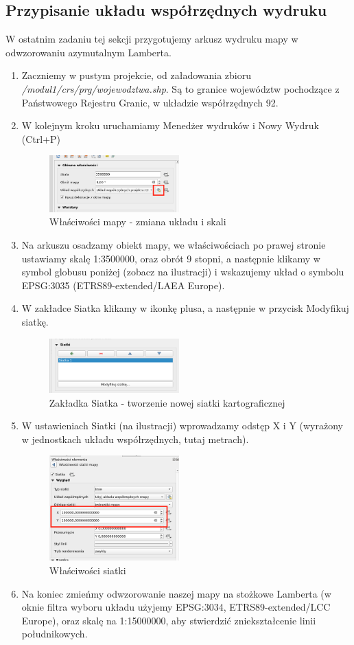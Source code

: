 \documentclass[a4paper,11pt, onecolumn, openany]{memoir}
\begin{document}
	\subsection{Przypisanie układu współrzędnych wydruku}
	W ostatnim zadaniu tej sekcji przygotujemy arkusz wydruku mapy w odwzorowaniu azymutalnym Lamberta.
	\begin{enumerate}
		\item Zaczniemy w pustym projekcie, od załadowania zbioru \emph{/modul1/crs/prg/wojewodztwa.shp}. Są to granice województw pochodzące z Państwowego Rejestru Granic, w układzie współrzędnych 92.
		\item W kolejnym kroku uruchamiamy Menedżer wydruków i Nowy Wydruk (Ctrl+P)
		\begin{figure}[!ht]
			\centering
			\includegraphics[width=5cm]{crs-wydruk-laea}
			\caption{Właściwości mapy - zmiana układu i skali}
		\end{figure}
		\item Na arkuszu osadzamy obiekt mapy, we właściwościach po prawej stronie ustawiamy skalę 1:3500000, oraz obrót 9 stopni, a następnie klikamy w symbol globusu poniżej (zobacz na ilustracji) i wskazujemy układ o symbolu EPSG:3035 (ETRS89-extended/LAEA Europe).
		\item W zakładce Siatka klikamy w ikonkę plusa, a następnie w przycisk Modyfikuj siatkę.
		\begin{figure}[!ht]
			\centering
			\includegraphics[width=5cm]{crs-laea-siatka}
			\caption{Zakładka Siatka - tworzenie nowej siatki kartograficznej}
		\end{figure}
		\item W ustawieniach Siatki (na ilustracji) wprowadzamy odstęp X i Y (wyrażony w jednostkach układu współrzędnych, tutaj metrach).
		\begin{figure}[!ht]
			\centering
			\includegraphics[width=5cm]{crs-laea-linie-siatki}
			\caption{Właściwości siatki}
		\end{figure}
		\item Na koniec zmieńmy odwzorowanie naszej mapy na stożkowe Lamberta (w oknie filtra wyboru układu użyjemy EPSG:3034, ETRS89-extended/LCC Europe), oraz skalę na 1:15000000, aby stwierdzić zniekształcenie linii południkowych.
	\end{enumerate}
\end{document}
